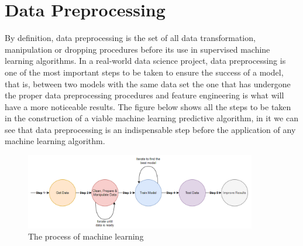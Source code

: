 

\chapter{Data Preprocessing}
\label{cha:data_preprocessing}
\hspace{10px}By definition, data preprocessing is the set of all data transformation, manipulation or dropping procedures before its use in supervised machine learning algorithms. In a real-world data science project, data preprocessing is one of the most important steps to be taken to ensure the success of a model, that is, between two models with the same data set the one that has undergone the proper data preprocessing procedures and feature engineering is what will have a more noticeable results. The figure below shows all the steps to be taken in the construction of a viable machine learning predictive algorithm, in it we can see that data preprocessing is an indispensable step before the application of any machine learning algorithm.

\begin{figure}[h]
    \centering
    \includegraphics[width=0.9\textwidth,height=0.2\textheight]{Chapters/Figures/data preprocessing.png}
    \caption{The process of machine learning}
    \label{fig:preprocessing}
\end{figure}


